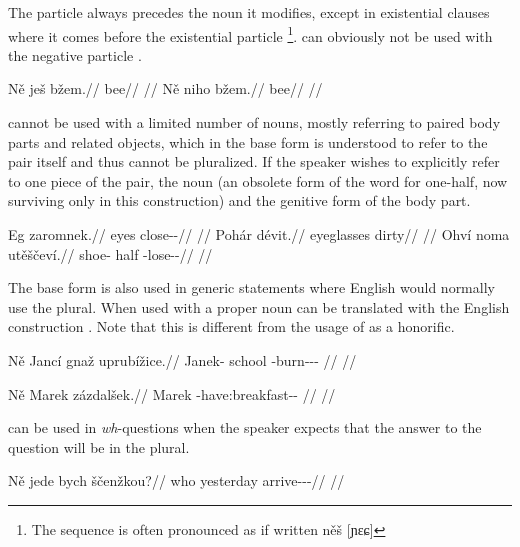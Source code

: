 The particle  always precedes the noun it modifies, except in
existential clauses where it comes before the existential particle
\footnote{The sequence is often pronounced as if written něš [ɲɛɕ]}.
 can obviously not be used with the negative particle
.

\pex
\a
\begingl
\gla Ně ješ bžem.//
\glb \Pl{} \Exst{} bee//
\glft {}//
\endgl
\a
\begingl
\gla *Ně niho bžem.//
\glb \Pl{} \N{}\Exst{} bee//
\glft {}//
\endgl
\xe

 cannot be used with a limited number of nouns, mostly referring to
paired body parts and related objects, which in the base form is understood to
refer to the pair itself and thus cannot be pluralized. If the speaker wishes to
explicitly refer to one piece of the pair, the noun  (an obsolete form
of the word for one-half, now surviving only in this construction) and the
genitive form of the body part.

\pex
\begingl
\gla Eg zaromnek.//
\glb eyes close-\Pv{}-\Pf{}//
\glft {}//
\endgl
\xe
\pex
\begingl
\gla Pohár dévit.//
\glb eyeglasses dirty//
\glft {}//
\endgl
\xe
\pex
\begingl
\gla Ohví noma utěščeví.//
\glb shoe-\Gen{} half \Refl{}-lose-\Av{}-\Cont{}//
\glft {}//
\endgl
\xe

The base form is also used in generic statements where English would normally
use the plural. When used with a
proper noun  can be translated with the English construction . Note that this is different from the usage of  as a honorific.

\pex
\begingl
    \gla Ně Jancí gnaž uprubížice.//
    \glb \Pl{} Janek-\Gen{} school \Refl{}-burn-\Av{}-\Pf{}-\Quot{} //
    \glft {}//
\endgl
\xe

\pex
\begingl
    \gla Ně Marek zázdalšek.//
    \glb \Pl{} Marek \Neg{}-have:breakfast-\Av{}-\Pf{} //
    \glft {}//
\endgl
\xe

 can be used in \emph{wh}-questions when the speaker expects that the
answer to the question will be in the plural.

\pex
\begingl
    \gla Ně jede bych ščenžkou?//
    \glb \Pl{} who yesterday arrive-\Av{}-\Pf{}-\Nz{}//
    \glft {}//
\endgl
\xe

